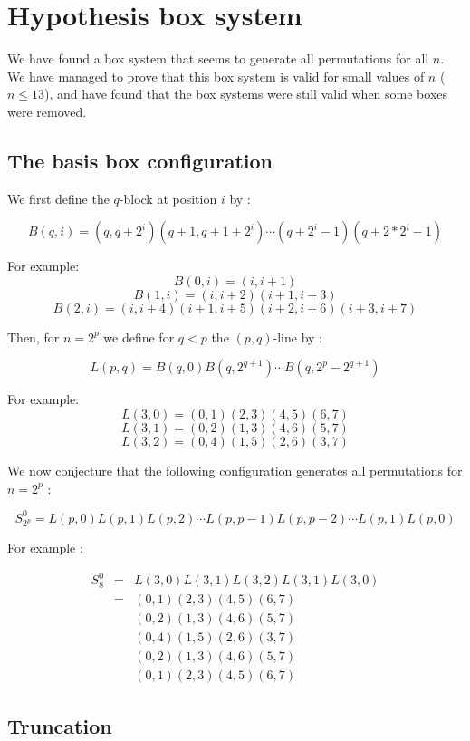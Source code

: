 \documentclass[11pt, a4paper]{article}
\begin{document}
\section{Hypothesis box system}

We have found a box system that seems to generate all permutations for all $n$.
We have managed to prove that this box system is valid for small values of $n$
($n \leq 13$), and have found that the box systems were still valid when some
boxes were removed.

\subsection{The basis box configuration}

We first define the $q$-block at position $i$ by :

$$B(q,i) = (q,q+2^i)(q+1,q+1+2^i)\cdots(q+2^i-1)(q+2*2^i-1)$$

For example: 
$$B(0,i) = (i,i+1)$$
$$B(1,i) = (i, i+2)(i+1, i+3)$$
$$B(2, i) = (i,i+4)(i+1,i+5)(i+2,i+6)(i+3,i+7)$$

Then, for $n=2^p$ we define for $q < p$ the $(p,q)$-line by :

$$L(p,q) = B(q,0) B(q,2^{q+1}) \cdots B(q,2^p-2^{q+1})$$

For example:
$$L(3,0) = (0,1)(2,3)(4,5)(6,7)$$
$$L(3,1) = (0,2)(1,3)(4,6)(5,7)$$
$$L(3,2) = (0,4)(1,5)(2,6)(3,7)$$

We now conjecture that the following configuration generates all permutations
for $n=2^p$ :

$$S_{2^p}^0 = L(p,0) L(p,1) L(p,2) \cdots L(p,p-1) L(p,p-2) \cdots L(p,1) L(p,0)$$

For example :

$$
\begin{aligned}
    S_8^0 & = & L(3,0) L(3,1) L(3,2) L(3,1) L(3,0) \\
        & = & (0,1)(2,3)(4,5)(6,7) \\
        & & (0,2)(1,3)(4,6)(5,7) \\
        & & (0,4)(1,5)(2,6)(3,7) \\
        & & (0,2)(1,3)(4,6)(5,7) \\
        & & (0,1)(2,3)(4,5)(6,7)
\end{aligned}$$

\subsection{Truncation}
\end{document}
